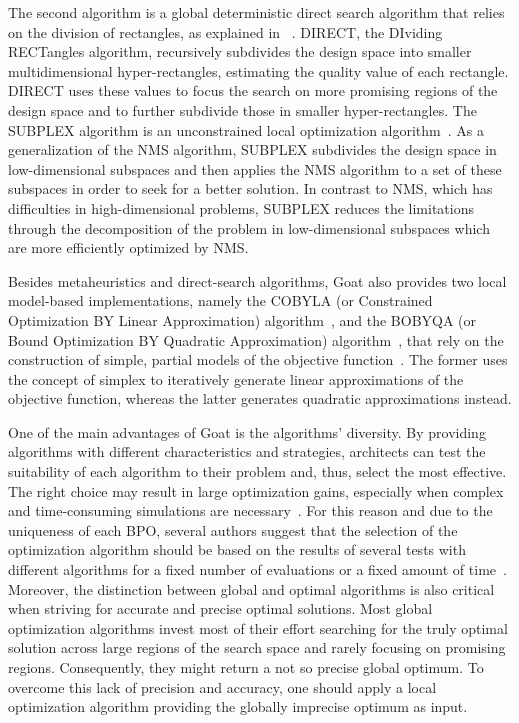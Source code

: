 	The second algorithm is a global deterministic direct search algorithm that relies on the division of rectangles, as explained in ~\cite{Jones1993DIRECT}. DIRECT, the DIviding RECTangles algorithm, recursively subdivides the design space into smaller multidimensional hyper-rectangles, estimating the quality value of each rectangle. DIRECT uses these values to focus the search on more promising regions of the design space and to further subdivide those in smaller hyper-rectangles. 
	The SUBPLEX algorithm is an unconstrained local optimization algorithm~\cite{Rowan1990}. As a generalization of the \ac{NMS} algorithm, SUBPLEX subdivides the design space in low-dimensional subspaces and then applies the \ac{NMS} algorithm to a set of these subspaces in order to seek for a better solution. In contrast to \ac{NMS}, which has difficulties in high-dimensional problems, SUBPLEX reduces the limitations through the decomposition of the problem in low-dimensional subspaces which are more efficiently optimized by \ac{NMS}.
	
	Besides metaheuristics and direct-search algorithms, Goat also provides two local model-based implementations, namely the COBYLA (or Constrained Optimization BY Linear Approximation) algorithm~\cite{Powell1994COBYLA}, and the BOBYQA (or Bound Optimization BY Quadratic Approximation) algorithm~\cite{Powell2009BOBYQA}, that rely on the construction of simple, partial models of the objective function~\cite{Koziel2011}. The former uses the concept of simplex to iteratively generate linear approximations of the objective function, whereas the latter generates quadratic approximations instead. 
	
	One of the main advantages of Goat is the algorithms' diversity. By providing algorithms with different characteristics and strategies, architects can test the suitability of each algorithm to their problem and, thus, select the most effective. The right choice may result in large optimization gains, especially when complex and time-consuming simulations are necessary~\cite{Wortmann2016BBO}. For this reason and due to the uniqueness of each \ac{BPO}, several authors suggest that the selection of the optimization algorithm should be based on the results of several tests with different algorithms for a fixed number of evaluations or a fixed amount of time~\cite{Hamdy2016,Wortmann2016BBO}. Moreover, the distinction between global and optimal algorithms is also critical when striving for accurate and precise optimal solutions. Most global optimization algorithms invest most of their effort searching for the truly optimal solution across large regions of the search space and rarely focusing on promising regions. Consequently, they might return a not so precise global optimum. To overcome this lack of precision and accuracy, one should apply a local optimization algorithm providing the globally imprecise optimum as input.


